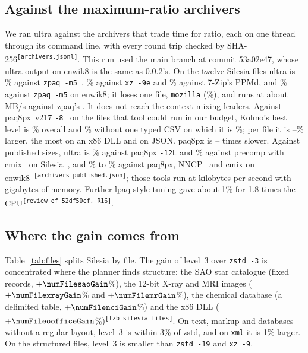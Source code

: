 \documentclass[conference]{IEEEtran}
\newcommand{\src}[1]{\textsuperscript{\tiny\color{gray}\texttt{[#1]}}}
\newcommand{\src}[1]{}
\begin{document}
\subsection{Against the maximum-ratio archivers}\label{sec:archivers}

We ran ultra against the archivers that trade time for ratio, each on one thread through its command line, with
every round trip checked by SHA-256\src{archivers.jsonl}. This run used the main branch at commit 53a02e47, whose
ultra output on enwik8 is the same as 0.0.2's. On the twelve Silesia files ultra is \numArcUSilVsZpaq\% against
\texttt{zpaq -m5}~\cite{zpaq}, \numArcUSilVsXz\% against \texttt{xz -9e} and \numArcUSilVsPpmd\% against 7-Zip's
PPMd, and \numArcUEnwVsZpaq\% against \texttt{zpaq -m5} on enwik8; it loses one file, \texttt{mozilla}
(\numArcUMozVsZpaq\%), and runs at about \numArcUSilC\,MB/s against zpaq's \numArcZpaqSilC. It does not reach the
context-mixing leaders. Against paq8px~v217 \texttt{-8}~\cite{paq,paq8px} on the \numArcPaqFiles{} files that tool could run
in our budget, Kolmo's best level is \numArcBestVsPaq\% overall and \numArcBestVsPaqNoEnergy\% without one typed CSV
on which it is \numArcEnergyVsPaq\%; per file it is \numArcPaqPerFileMin--\numArcPaqPerFileMax\% larger, the most on
an x86 DLL and on JSON. paq8px is \numArcPaqSlowMin--\numArcPaqSlowMax{} times slower. Against
published sizes, ultra is \numArcUSilVsPaqTwelve\% against paq8px \texttt{-12L} and \numArcUSilVsCmix\% against
precomp with cmix~\cite{cmix} on Silesia~\cite{silesia_bench}, and \numArcUEnwVsPaqTwelve\% to \numArcUEnwVsCmix\%
against paq8px, NNCP~\cite{nncp_v2} and cmix on enwik8~\cite{ltcb}\src{archivers-published.json}; those tools run at
kilobytes per second with gigabytes of memory. Further lpaq-style tuning gave about 1\% for 1.8 times the CPU\src{review of 52df50cf, R16}.

\subsection{Where the gain comes from}

\begin{table}[t]
\caption{Silesia file by file, ratio, one thread. $\Delta_3$: Kolmo -3 against zstd -3. Source:
\texttt{data/lzb-silesia-files.csv}.}\label{tab:files}
\centering\scriptsize\setlength{\tabcolsep}{2.6pt}

\end{table}

Table~\ref{tab:files} splits Silesia by file. The gain of level~3 over \texttt{zstd -3} is concentrated where the
planner finds structure: the SAO star catalogue (fixed records, $+\numFilesaoGain$\%), the 12-bit X-ray and MRI
images ($+\numFilexrayGain$\% and $+\numFilemrGain$\%), the chemical database (a delimited table,
$+\numFilenciGain$\%) and the x86 DLL ($+\numFileoofficeGain$\%)\src{lzb-silesia-files}. On text, markup and
databases without a regular layout, level~3 is within 3\% of zstd, and on \texttt{xml} it is 1\% larger. On the
structured files, level~3 is smaller than \texttt{zstd -19} and \texttt{xz -9}.
\end{document}
